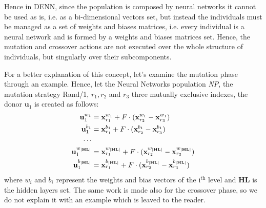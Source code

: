Hence in DENN, since the population is composed by neural networks it cannot be used as is, i.e. as a bi-dimensional vectors set, but instead the individuals must be managed as a set of weights and biases matrices, i.e. every individual is a neural network and is formed by a weights and biases matrices set. Hence, the mutation and crossover actions are not executed over the whole structure of individuals, but singularly over their subcomponents. 

For a better explanation of this concept, let's examine the mutation phase through an example. Hence, let the Neural Networks population \textit{NP}, the mutation strategy Rand/1, $r_1, r_2$ and $r_3$ three mutually exclusive indexes, the donor $\textbf{u}_{1}$ is created as follows:
\begin{align}
	\textbf{u}_{1}^{w_1} &= \textbf{x}_{r_1}^{w_1} + F \cdot (\textbf{x}_{r_2}^{w_1} - \textbf{x}_{r_3}^{w_1}) \\
	\textbf{u}_{1}^{b_1} &= \textbf{x}_{r_1}^{b_1} + F \cdot (\textbf{x}_{r_2}^{b_1} - \textbf{x}_{r_3}^{b_1}) \\
	\cdots \cr
	\textbf{u}_{1}^{w_{|\textbf{HL}|}} &= \textbf{x}_{r_1}^{w_{|\textbf{HL}|}} + F \cdot (\textbf{x}_{r_2}^{w_{|\textbf{HL}|}} - \textbf{x}_{r_3}^{w_{|\textbf{HL}|}}) \\
	\textbf{u}_{1}^{b_{|\textbf{HL}|}} &= \textbf{x}_{r_1}^{b_{|\textbf{HL}|}} + F \cdot (\textbf{x}_{r_2}^{b_{|\textbf{HL}|}} - \textbf{x}_{r_3}^{b_{|\textbf{HL}|}})
\end{align}
where $w_i$ and $b_i$ represent the weights and bias vectors of the $\textrm{i}^{\textrm{th}}$ level and \textbf{HL} is the hidden layers set. The same work is made also for the crossover phase, so we do not explain it with an example which is leaved to the reader.

